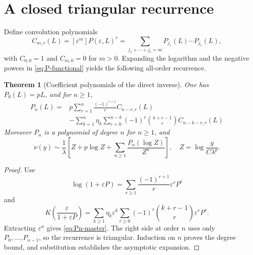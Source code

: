\documentclass[11pt,a4paper,oneside,openany]{book}
\newtheorem{theorem}{Theorem}[chapter]
\theoremstyle{definition}
\theoremstyle{remark}
\begin{document}
\section{A closed triangular recurrence}
Define convolution polynomials
\begin{equation}
 C_{m,r}(L)=[\varepsilon^m]P(\varepsilon,L)^r
 =\sum_{j_1+\cdots+j_r=m}P_{j_1}(L)\cdots P_{j_r}(L),
 \label{eq:Cmr}
\end{equation}
with $C_{0,0}=1$ and $C_{m,0}=0$ for $m>0$.  Expanding the logarithm and the
negative powers in \cref{eq:P-functional} yields the following all-order
recurrence.

\begin{theorem}[Coefficient polynomials of the direct inverse]
\label{thm:P-recurrence}
One has $P_0(L)=pL$, and for $n\ge1$,
\begin{equation}
 \boxed{\begin{aligned}
 P_n(L)={}&p\sum_{r=1}^{n}\frac{(-1)^{r+1}}r C_{n-r,r}(L)\\
 &-\sum_{k=1}^{n}\eta_k
   \sum_{r=0}^{n-k}(-1)^r\binom{k+r-1}{r}
   C_{n-k-r,r}(L)
 \end{aligned}}
 \label{eq:Pn-master}
\end{equation}
Moreover $P_n$ is a polynomial of degree $n$ for $n\ge1$, and
\begin{equation}
 \boxed{
 \nu(y)\sim\frac1\lambda\left[
 Z+p\log Z+\sum_{n\ge1}\frac{P_n(\log Z)}{Z^n}\right],
 \quad Z=\log\frac{y}{C\lambda^p}.}
 \label{eq:inverse-polylog-master}
\end{equation}
\end{theorem}

\begin{proof}
Use
\[
 \log(1+\varepsilon P)
 =\sum_{r\ge1}\frac{(-1)^{r+1}}r\varepsilon^rP^r
\]
and
\[
 K\!\left(\frac{\varepsilon}{1+\varepsilon P}\right)
 =\sum_{k\ge1}\eta_k\varepsilon^k
  \sum_{r\ge0}(-1)^r\binom{k+r-1}{r}\varepsilon^rP^r.
\]
Extracting $\varepsilon^n$ gives \cref{eq:Pn-master}.  The right side at
order $n$ uses only $P_0,\ldots,P_{n-1}$, so the recurrence is triangular.
Induction on $n$ proves the degree bound, and substitution establishes the
asymptotic expansion.
\end{proof}
\end{document}
